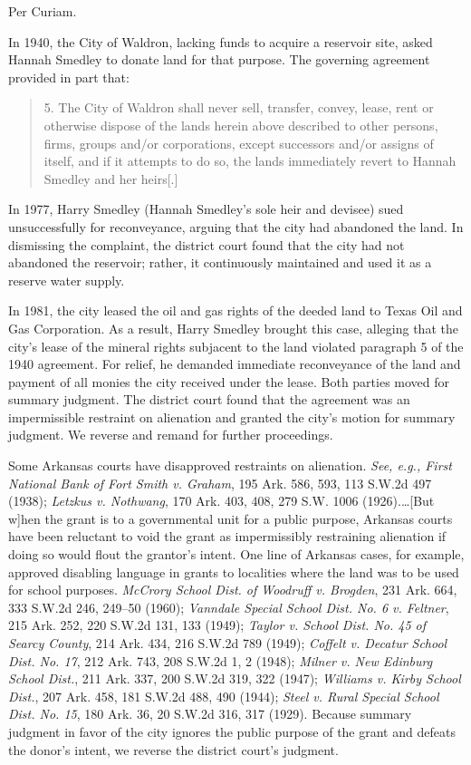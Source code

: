 

\opinion Per Curiam.

In 1940, the City of Waldron, lacking funds to acquire a reservoir site, asked
Hannah Smedley to donate land for that purpose. The governing agreement
provided in part that:
\begin{quote}
5. The City of Waldron shall never sell, transfer, convey, lease, rent or
otherwise dispose of the lands herein above described to other persons, firms,
groups and/or corporations, except successors and/or assigns of itself, and if
it attempts to do so, the lands immediately revert to Hannah Smedley and her
heirs[.]
\end{quote}

In 1977, Harry Smedley (Hannah Smedley's sole heir and devisee) sued
unsuccessfully for reconveyance, arguing that the city had abandoned the land.
In dismissing the complaint, the district court found that the city had not
abandoned the reservoir; rather, it continuously maintained and used it as a
reserve water supply.

In 1981, the city leased the oil and gas rights of the deeded land to Texas Oil
and Gas Corporation. As a result, Harry Smedley brought this case, alleging
that the city's lease of the mineral rights subjacent to the land violated
paragraph 5 of the 1940 agreement. For relief, he demanded immediate
reconveyance of the land and payment of all monies the city received under the
lease. Both parties moved for summary judgment. The district court found that
the agreement was an impermissible restraint on alienation and granted the
city's motion for summary judgment. We reverse and remand for further
proceedings.

Some Arkansas courts have disapproved restraints on alienation. \textit{See,
e.g., First National Bank of Fort Smith v. Graham}, 195 Ark. 586, 593, 113
S.W.2d 497 (1938); \textit{Letzkus v. Nothwang}, 170 Ark. 403, 408, 279 S.W.
1006 (1926).\dots [But w]hen the grant is to a governmental unit for a
public purpose, Arkansas courts have been reluctant to void the grant as
impermissibly restraining alienation if doing so would flout the grantor's
intent. One line of Arkansas cases, for example, approved disabling language in
grants to localities where the land was to be used for school purposes.
\textit{McCrory School Dist. of Woodruff v. Brogden}, 231 Ark. 664, 333 S.W.2d
246, 249--50 (1960); \textit{Vanndale Special School Dist. No. 6 v. Feltner},
215 Ark. 252, 220 S.W.2d 131, 133 (1949); \textit{Taylor v. School Dist. No. 45
of Searcy County}, 214 Ark. 434, 216 S.W.2d 789 (1949); \textit{Coffelt v.
Decatur School Dist. No. 17}, 212 Ark. 743, 208 S.W.2d 1, 2 (1948);
\textit{Milner v. New Edinburg School Dist.}, 211 Ark. 337, 200 S.W.2d 319, 322
(1947); \textit{Williams v. Kirby School Dist.}, 207 Ark. 458, 181 S.W.2d 488,
490 (1944); \textit{Steel v. Rural Special School Dist. No. 15}, 180 Ark. 36,
20 S.W.2d 316, 317 (1929). Because summary judgment in favor of the city
ignores the public purpose of the grant and defeats the donor's intent, we
reverse the district court's judgment.


